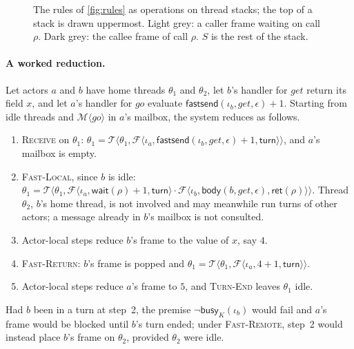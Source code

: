 \documentclass[11pt]{article}
\theoremstyle{definition}
\theoremstyle{remark}
\newcommand{\Thr}[1]{\mathcal{T}\langle #1\rangle}
\newcommand{\Frm}[1]{\mathcal{F}\langle #1\rangle}
\newcommand{\Msg}[1]{\mathcal{M}\langle #1\rangle}
\newcommand{\turn}{\mathsf{turn}}
\newcommand{\ret}[1]{\mathsf{ret}(#1)}
\newcommand{\wait}[1]{\mathsf{wait}(#1)}
\newcommand{\fsend}{\mathsf{fastsend}}
\newcommand{\busy}{\mathsf{busy}}
\newcommand{\body}{\mathsf{body}}
\newcommand{\pass}{\mathsf{pass}}
\begin{document}
\begin{figure}[t]
\caption{The rules of \cref{fig:rules} as operations on thread stacks; the top of a stack
is drawn uppermost. Light grey: a caller frame waiting on call $\rho$. Dark grey: the
callee frame of call $\rho$. $S$ is the rest of the stack.}
\label{fig:rulestacks}
\end{figure}

\paragraph{A worked reduction.} Let actors $a$ and $b$ have home threads $\theta_1$ and
$\theta_2$, let $b$'s handler for $\mathit{get}$ return its field $x$, and let $a$'s
handler for $\mathit{go}$ evaluate $\fsend(\iota_b, \mathit{get}, \epsilon) + 1$. Starting
from idle threads and $\Msg{\mathit{go}}$ in $a$'s mailbox, the system reduces as
follows.
\begin{enumerate}[leftmargin=1.6em]
  \item \textsc{Receive} on $\theta_1$: $\theta_1 = \Thr{\theta_1,
  \Frm{\iota_a, \fsend(\iota_b,\mathit{get},\epsilon)+1, \turn}}$, and $a$'s mailbox is
  empty.
  \item \textsc{Fast-Local}, since $b$ is idle: $\theta_1 = \Thr{\theta_1,
  \Frm{\iota_a, \wait{\rho}+1, \turn}\cdot\Frm{\iota_b, \body(b,\mathit{get},\epsilon),
  \ret{\rho}}}$. Thread $\theta_2$, $b$'s home thread, is not involved and may meanwhile
  run turns of other actors; a message already in $b$'s mailbox is not consulted.
  \item Actor-local steps reduce $b$'s frame to the value of $x$, say $4$.
  \item \textsc{Fast-Return}: $b$'s frame is popped and $\theta_1 = \Thr{\theta_1,
  \Frm{\iota_a, 4+1, \turn}}$.
  \item Actor-local steps reduce $a$'s frame to $5$, and \textsc{Turn-End} leaves
  $\theta_1$ idle.
\end{enumerate}
Had $b$ been in a turn at step~2, the premise $\neg\busy_K(\iota_b)$ would fail and $a$'s
frame would be blocked until $b$'s turn ended; under \textsc{Fast-Remote}, step~2 would
instead place $b$'s frame on $\theta_2$, provided $\theta_2$ were idle.
\end{document}
